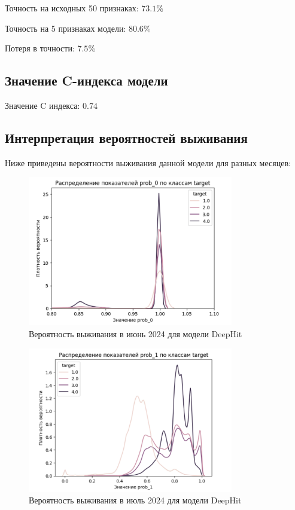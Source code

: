 \documentclass[a4paper,14pt,oneside,openany]{memoir}
\begin{document}
Точность на исходных 50 признаках: $73.1\%$

Точность на 5 признаках модели: $80.6\%$

Потеря в точности: $7.5\%$


\subsection{Значение C-индекса модели}

Значение C индекса: $0.74$

\subsection{Интерпретация вероятностей выживания}

Ниже приведены вероятности выживания данной модели для разных месяцев: 

\begin{figure}[H]
	\includegraphics[width=0.8\textwidth]{../figures/prob_0_deephit.png}
	\caption{Вероятность выживания в июнь 2024 для модели DeepHit}
\end{figure}

\begin{figure}[H]
	\includegraphics[width=0.8\textwidth]{../figures/prob_1_deephit.png}
	\caption{Вероятность выживания в июль 2024 для модели DeepHit}
\end{figure}
\end{document}

